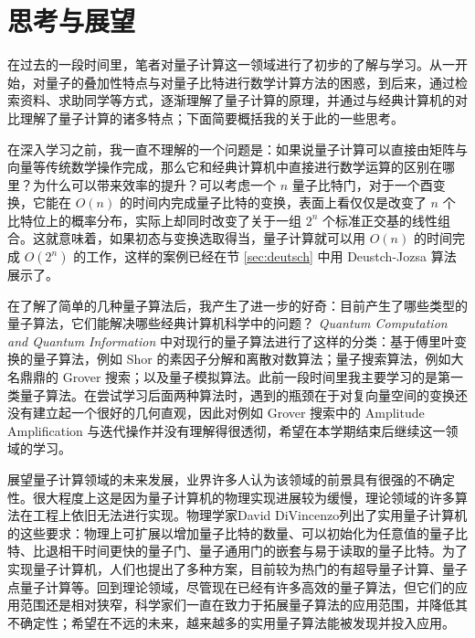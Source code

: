 \section{思考与展望}

在过去的一段时间里，笔者对量子计算这一领域进行了初步的了解与学习。从一开始，对量子的叠加性特点与对量子比特进行数学计算方法的困惑，到后来，通过检索资料、求助同学等方式，逐渐理解了量子计算的原理，并通过与经典计算机的对比理解了量子计算的诸多特点；下面简要概括我的关于此的一些思考。

在深入学习之前，我一直不理解的一个问题是：如果说量子计算可以直接由矩阵与向量等传统数学操作完成，那么它和经典计算机中直接进行数学运算的区别在哪里？为什么可以带来效率的提升？可以考虑一个 $n$ 量子比特门，对于一个酉变换，它能在 $O(n)$ 的时间内完成量子比特的变换，表面上看仅仅是改变了 $n$ 个比特位上的概率分布，实际上却同时改变了关于一组 $2^n$ 个标准正交基的线性组合。这就意味着，如果初态与变换选取得当，量子计算就可以用 $O(n)$ 的时间完成 $O(2^n)$ 的工作，这样的案例已经在节 \ref{sec:deutsch} 中用 Deustch-Jozsa 算法展示了。

在了解了简单的几种量子算法后，我产生了进一步的好奇：目前产生了哪些类型的量子算法，它们能解决哪些经典计算机科学中的问题？\textit{ Quantum Computation and Quantum Information}\cite{nielsen2002quantum} 中对现行的量子算法进行了这样的分类：基于傅里叶变换的量子算法，例如 Shor 的素因子分解和离散对数算法；量子搜索算法，例如大名鼎鼎的 Grover 搜索；以及量子模拟算法。此前一段时间里我主要学习的是第一类量子算法。在尝试学习后面两种算法时，遇到的瓶颈在于对复向量空间的变换还没有建立起一个很好的几何直观，因此对例如 Grover 搜索中的 Amplitude Amplification 与迭代操作并没有理解得很透彻，希望在本学期结束后继续这一领域的学习。

展望量子计算领域的未来发展，业界许多人认为该领域的前景具有很强的不确定性。很大程度上这是因为量子计算机的物理实现进展较为缓慢，理论领域的许多算法在工程上依旧无法进行实现。物理学家David DiVincenzo列出了实用量子计算机的这些要求\cite{divincenzo2000physical}：物理上可扩展以增加量子比特的数量、可以初始化为任意值的量子比特、比退相干时间更快的量子门、量子通用门的嵌套与易于读取的量子比特。为了实现量子计算机，人们也提出了多种方案，目前较为热门的有超导量子计算、量子点量子计算等。回到理论领域，尽管现在已经有许多高效的量子算法，但它们的应用范围还是相对狭窄，科学家们一直在致力于拓展量子算法的应用范围，并降低其不确定性；希望在不远的未来，越来越多的实用量子算法能被发现并投入应用。
